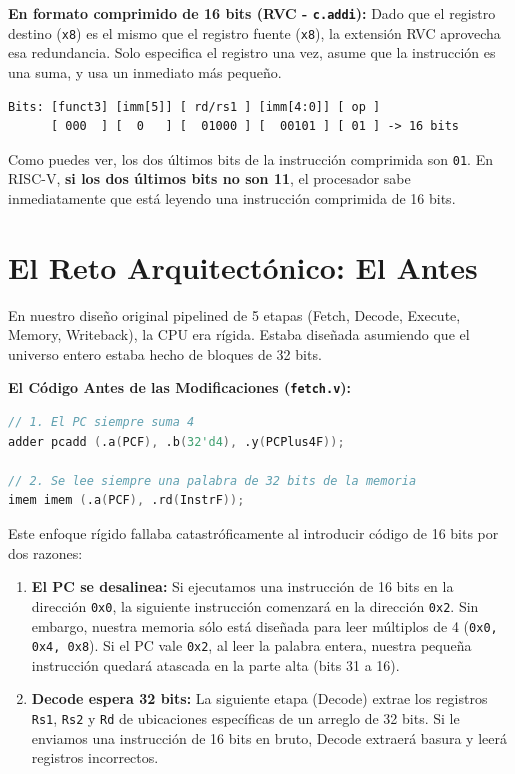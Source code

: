 \documentclass[12pt, a4paper]{article}
\begin{document}
\textbf{En formato comprimido de 16 bits (RVC - \texttt{c.addi}):}
Dado que el registro destino (\texttt{x8}) es el mismo que el registro fuente (\texttt{x8}), la extensi\'on RVC aprovecha esa redundancia. Solo especifica el registro una vez, asume que la instrucci\'on es una suma, y usa un inmediato m\'as peque\~no.
\begin{verbatim}
Bits: [funct3] [imm[5]] [ rd/rs1 ] [imm[4:0]] [ op ]
      [ 000  ] [  0   ] [  01000 ] [  00101 ] [ 01 ] -> 16 bits
\end{verbatim}

Como puedes ver, los dos \'ultimos bits de la instrucci\'on comprimida son \texttt{01}. En RISC-V, \textbf{si los dos \'ultimos bits no son 11}, el procesador sabe inmediatamente que est\'a leyendo una instrucci\'on comprimida de 16 bits.

\section{El Reto Arquitect\'onico: El Antes}

En nuestro dise\~no original pipelined de 5 etapas (Fetch, Decode, Execute, Memory, Writeback), la CPU era r\'igida. Estaba dise\~nada asumiendo que el universo entero estaba hecho de bloques de 32 bits.

\textbf{El C\'odigo Antes de las Modificaciones (\texttt{fetch.v}):}
\begin{lstlisting}[language=Verilog, caption=Etapa Fetch Original]
// 1. El PC siempre suma 4
adder pcadd (.a(PCF), .b(32'd4), .y(PCPlus4F));

// 2. Se lee siempre una palabra de 32 bits de la memoria
imem imem (.a(PCF), .rd(InstrF));
\end{lstlisting}

Este enfoque r\'igido fallaba catastr\'oficamente al introducir c\'odigo de 16 bits por dos razones:
\begin{enumerate}
    \item \textbf{El PC se desalinea:} Si ejecutamos una instrucci\'on de 16 bits en la direcci\'on \texttt{0x0}, la siguiente instrucci\'on comenzar\'a en la direcci\'on \texttt{0x2}. Sin embargo, nuestra memoria s\'olo est\'a dise\~nada para leer m\'ultiplos de 4 (\texttt{0x0, 0x4, 0x8}). Si el PC vale \texttt{0x2}, al leer la palabra entera, nuestra peque\~na instrucci\'on quedar\'a atascada en la parte alta (bits 31 a 16).
    \item \textbf{Decode espera 32 bits:} La siguiente etapa (Decode) extrae los registros \texttt{Rs1}, \texttt{Rs2} y \texttt{Rd} de ubicaciones espec\'ificas de un arreglo de 32 bits. Si le enviamos una instrucci\'on de 16 bits en bruto, Decode extraer\'a basura y leer\'a registros incorrectos.
\end{enumerate}
\end{document}
